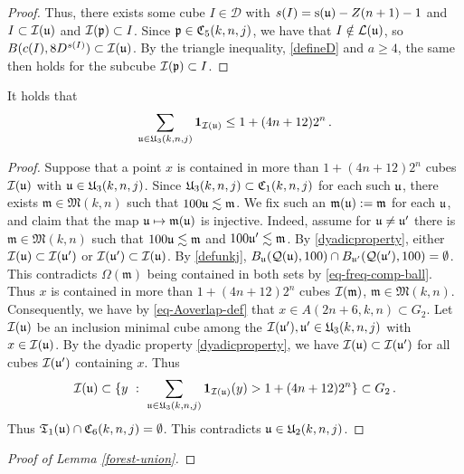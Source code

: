{\begin{proof}
    Thus, there exists some cube $I \in \mathcal{D}$ with $s(I) = \ps(\fu) - Z(n+1) - 1$ and $I \subset \sc(\fu)$ and $\sc(\fp) \subset I$. Since $\fp \in \fC_5(k,n,j)$, we have that $I \notin \mathcal{L}(\fu)$, so $B(c(I), 8D^{s(I)}) \subset \sc(\fu)$. By the triangle inequality, \eqref{defineD} and $a \ge 4$, the same then holds for the subcube $\sc(\fp) \subset I$.
\end{proof}


\begin{lemma}
    \label{forest-stacking}
    It holds that
    \begin{equation}
        \sum_{\fu \in \fU_3(k,n,j)} \mathbf{1}_{\sc(\fu)} \le 1 + (4n+12)2^{n}\,.
    \end{equation}
\end{lemma}

\begin{proof}
    Suppose that a point $x$ is contained in more than $1 + (4n + 12)2^n$ cubes $\sc(\fu)$ with $\fu \in \fU_3(k,n,j)$. Since $\fU_3(k,n,j) \subset \fC_1(k,n,j)$ for each such $\fu$, there exists $\mathfrak{m} \in \mathfrak{M}(k,n)$ such that $100\fu \lesssim \mathfrak{m}$. We fix such an $\mathfrak{m}(\fu) := \mathfrak{m}$ for each $\fu$, and claim that the map $\fu \mapsto\mathfrak{m}(\fu)$ is injective. Indeed, assume for $\fu\neq \fu'$ there is $\mathfrak{m} \in \mathfrak{M}(k,n)$ such that $100\fu \lesssim \mathfrak{m}$ and $100\fu' \lesssim \mathfrak{m}$. By \eqref{dyadicproperty}, either $\sc(\fu) \subset \sc(\fu')$ or $\sc(\fu') \subset \sc(\fu)$. By \eqref{defunkj}, $B_{\fu}(\fcc(\fu),100) \cap B_{\fu'}(\fcc(\fu'), 100) = \emptyset$. This contradicts $\Omega(\mathfrak{m})$ being contained in both sets by \eqref{eq-freq-comp-ball}. Thus $x$ is contained in more than $1 + (4n + 12)2^n$ cubes $\sc(\mathfrak{m})$, $\mathfrak{m} \in \mathfrak{M}(k,n)$. Consequently, we have by \eqref{eq-Aoverlap-def} that $x \in A(2n + 6, k,n) \subset G_2$. Let $\sc(\fu)$ be an inclusion minimal cube among the $\sc(\fu'), \fu' \in \fU_3(k,n,j)$ with $x \in \sc(\fu)$. By the dyadic property \eqref{dyadicproperty}, we have $\sc(\fu) \subset \sc(\fu')$ for all cubes $\sc(\fu')$ containing $x$. Thus
    $$
        \sc(\fu) \subset \{y \ : \ \sum_{\fu \in \fU_3(k,n,j)} \mathbf{1}_{\sc(\fu)}(y) > 1 + (4n+12)2^{n}\} \subset G_2\,.
    $$
    Thus $\mathfrak{T}_1(\fu) \cap \fC_6(k,n,j) = \emptyset$.
    This contradicts $\fu \in \fU_2(k,n,j)$.
\end{proof}

\begin{proof}[Proof of Lemma \ref{forest-union}]


\end{proof}}
